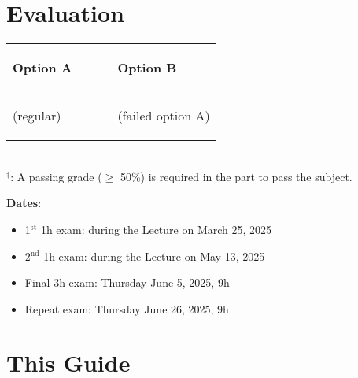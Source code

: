 \section*{Evaluation}

\begin{tabular}{p{0.5\linewidth}p{0.5\linewidth}}
\begin{flushleft}\textbf{Option A}\end{flushleft} & \begin{flushright}\textbf{Option B}\end{flushright}\\[-0.75cm]
\begin{flushleft}(regular)\end{flushleft} & \begin{flushright}(failed option A)\end{flushright}\\[-0.5cm]
\end{tabular}
\begin{center}
\quad
{}
\\
$^{\dagger}$: A passing grade ($\ge$ 50\%) is required in the part to pass the subject.\\[0.1cm]
\end{center}

\noindent
\textbf{Dates}:
\begin{itemize}
\item 1$^\textrm{st}$ 1h exam: during the Lecture on March 25, 2025
\item 2$^\textrm{nd}$ 1h exam: during the Lecture on May 13, 2025
\item Final 3h exam: Thursday June 5, 2025, 9h
\item Repeat exam: Thursday June 26, 2025, 9h
\end{itemize}

\newpage

\section*{This Guide}

